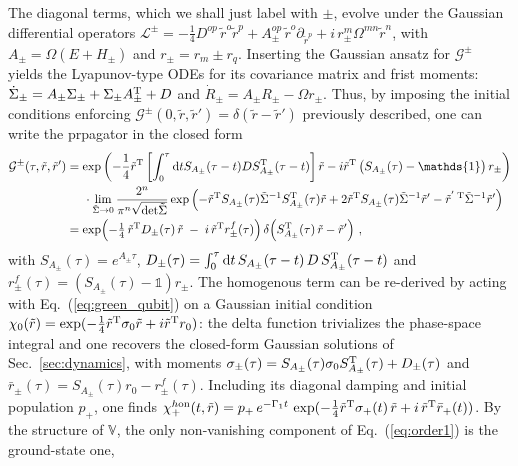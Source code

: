 \documentclass[%
reprint,
superscriptaddress,
nofootinbib,
 amsmath,amssymb,
prx,
floatfix,
]{revtex4-2}
\begin{document}
The diagonal terms, which we shall just label with $\pm$,  evolve under the Gaussian differential operators $\mathcal{L}^{\pm} = -\frac{1}{4} D^{op}\, \tilde{r}^o \tilde{r}^p + A^{op}_{\pm}\, \tilde{r}^o \partial_{\tilde{r}^p} + i\, r^m_{\pm} \Omega^{mn} \tilde{r}^n$, with $A_\pm = \Omega(E + H_\pm)$ and $r_{\pm} = r_m \pm r_q$. Inserting the Gaussian ansatz for $\mathcal{G}^{\pm}$ yields the Lyapunov-type ODEs for its covariance matrix and frist moments: $\dot{\Sigma}_\pm = A_\pm \Sigma_\pm + \Sigma_\pm A^{\rm T}_\pm + D$ and $\dot{R}_\pm = A_\pm R_\pm - \Omega r_\pm$. Thus, by imposing the initial conditions enforcing $\mathcal{G}^{\pm}(0, \tilde{r}, \tilde{r}') = \delta(\tilde{r} - \tilde{r}')$ previously described, one can write the prpagator in the closed form
\begin{align}
\label{eq:green_qubit}
    \mathcal{G}^{\pm}(\tau, \tilde{r}, \tilde{r}') &=  \exp \left( -\frac{1}{4} \tilde{r}^{\rm T}  \left[\int_{0}^{\tau} \text{d}t S_{A_\pm}(\tau - t) D S^{\rm T}_{A_\pm}(\tau - t) \right]  \tilde{r}  - i  \tilde{r}^{\rm T} \left(S_{A_\pm}(\tau) - \mathds{1} \right)  r_{\pm}   \right) \nonumber \\
&\hspace{0.5cm}\cdot \lim_{\tilde{\Sigma} \to 0}  \frac{2^n}{\pi^n \sqrt{\text{det} \tilde{\Sigma} }}  \exp \left( - \tilde{r}^{\rm T} S_{A_\pm}(\tau) \tilde{\Sigma}^{-1} S_{A_\pm}^{\rm T}(\tau) \tilde{r}  + 2  \tilde{r}^{\rm T} S_{A_\pm} (\tau)   \tilde{\Sigma}^{-1} \tilde{r}' - \tilde{r}^{' \; \rm T } \tilde{\Sigma}^{-1} \tilde{r}' \right) \nonumber \\  
&= \exp\!\left( -\tfrac{1}{4}\, \tilde{r}^{\rm T} D_\pm(\tau)\, \tilde{r} \;-\; i\, \tilde{r}^{\rm T} r^f_\pm(\tau) \right) \delta\!\left( S^{\rm T}_{A_\pm}(\tau)\, \tilde{r} - \tilde{r}' \right)\,,
\end{align}
with $S_{A_\pm}(\tau) = e^{A_\pm \tau}$, $D_\pm(\tau) = \int_0^\tau {\rm d}t\, S_{A_\pm}(\tau - t)\, D\, S^{\rm T}_{A_\pm}(\tau - t)$ and $r^f_\pm(\tau) = \left( S_{A_\pm}(\tau) - \mathds{1} \right) r_\pm$. The homogenous term can be re-derived by acting with Eq.~(\ref{eq:green_qubit}) on a Gaussian initial condition $\chi_0(\tilde{r}) = \exp( -\frac{1}{4} \tilde{r}^{\rm T} \sigma_0 \tilde{r} + i \tilde{r}^{\rm T} r_0 )$: the delta function trivializes the phase-space integral and one recovers the closed-form Gaussian solutions of Sec.~\ref{sec:dynamics}, with moments $\sigma_\pm(\tau) = S_{A_\pm} (\tau)\sigma_0 S^{\rm T}_{A_\pm} (\tau)+ D_\pm(\tau)$ and $\bar{r}_\pm(\tau) = S_{A_\pm}  (\tau) r_0 - r^f_\pm(\tau)$. Including its diagonal damping and initial population $p_+$, one finds  $\chi_{+}^{h \text{on}}(t, \tilde{r}) = p_+\, e^{-\Gamma_1 t}\, \exp( -\frac{1}{4} \tilde{r}^{\rm T} \sigma_+(t)\, \tilde{r} + i\, \tilde{r}^{\rm T} \bar{r}_+(t) )$. By the structure of $\mathds{V}$, the only non-vanishing component of Eq.~(\ref{eq:order1}) is the ground-state one,
\end{document}
